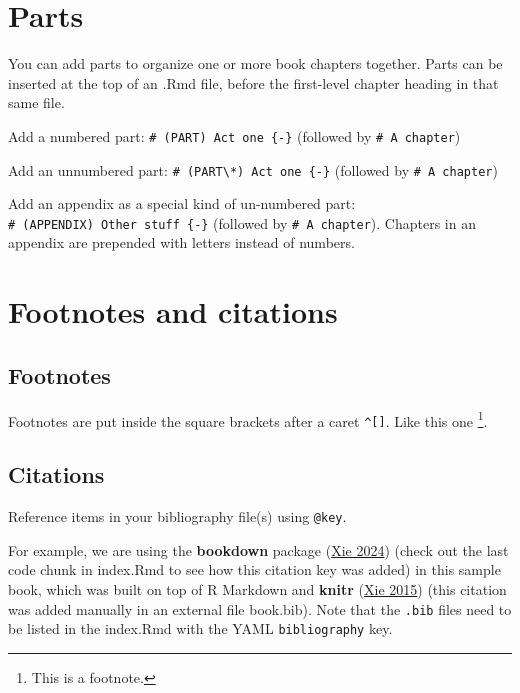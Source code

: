 \documentclass[
]{book}
\begin{document}
\hypertarget{parts}{%
\chapter{Parts}\label{parts}}

You can add parts to organize one or more book chapters together. Parts
can be inserted at the top of an .Rmd file, before the first-level
chapter heading in that same file.

Add a numbered part: \texttt{\#\ (PART)\ Act\ one\ \{-\}} (followed by
\texttt{\#\ A\ chapter})

Add an unnumbered part:
\texttt{\#\ (PART\textbackslash{}*)\ Act\ one\ \{-\}} (followed by
\texttt{\#\ A\ chapter})

Add an appendix as a special kind of un-numbered part:
\texttt{\#\ (APPENDIX)\ Other\ stuff\ \{-\}} (followed by
\texttt{\#\ A\ chapter}). Chapters in an appendix are prepended with
letters instead of numbers.

\hypertarget{footnotes-and-citations}{%
\chapter{Footnotes and citations}\label{footnotes-and-citations}}

\hypertarget{footnotes}{%
\section{Footnotes}\label{footnotes}}

Footnotes are put inside the square brackets after a caret
\texttt{\^{}{[}{]}}. Like this one \footnote{This is a footnote.}.

\hypertarget{citations}{%
\section{Citations}\label{citations}}

Reference items in your bibliography file(s) using \texttt{@key}.

For example, we are using the \textbf{bookdown} package
(\protect\hyperlink{ref-R-bookdown}{Xie 2024}) (check out the last code
chunk in index.Rmd to see how this citation key was added) in this
sample book, which was built on top of R Markdown and \textbf{knitr}
(\protect\hyperlink{ref-xie2015}{Xie 2015}) (this citation was added
manually in an external file book.bib). Note that the \texttt{.bib}
files need to be listed in the index.Rmd with the YAML
\texttt{bibliography} key.
\end{document}
